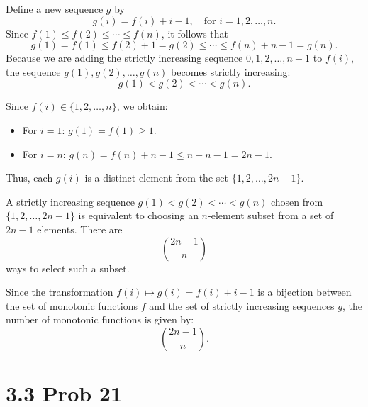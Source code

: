 \documentclass{report}
\begin{document}

\begin{proofWithHibiscus}
  Define a new sequence \( g \) by
  \[
  g(i) = f(i) + i - 1, \quad \text{for } i=1,2,\dots,n.
  \]
  Since \( f(1)\le f(2)\le \cdots \le f(n) \), it follows that
  \[
  g(1) = f(1) \le f(2) + 1 = g(2) \le \cdots \le f(n) + n - 1 = g(n).
  \]
  Because we are adding the strictly increasing sequence \( 0,1,2,\dots,n-1 \) to \( f(i) \), the sequence \( g(1), g(2), \dots, g(n) \) becomes strictly increasing:
  \[
  g(1) < g(2) < \cdots < g(n).
  \]
  
  \bigskip 

  Since \( f(i) \in \{1,2,\dots,n\} \), we obtain:
  \begin{itemize}
      \item For \( i=1 \): \( g(1) = f(1) \ge 1 \).
      \item For \( i=n \): \( g(n) = f(n) + n - 1 \le n + n - 1 = 2n - 1 \).
  \end{itemize}
  
  Thus, each \( g(i) \) is a distinct element from the set \( \{1, 2, \dots, 2n-1\} \).
  
  \bigskip
  
  A strictly increasing sequence \( g(1) < g(2) < \cdots < g(n) \) chosen from \( \{1,2,\dots,2n-1\} \) is equivalent to choosing an \( n \)-element subset from a set of \( 2n-1 \) elements. There are
  \[
  \binom{2n-1}{n}
  \]
  ways to select such a subset.
    
  Since the transformation \( f(i) \mapsto g(i) = f(i) + i - 1 \) is a bijection between the set of monotonic functions \( f \) and the set of strictly increasing sequences \( g \), the number of monotonic functions is given by:
  \[
  \boxed{\binom{2n-1}{n}}.
  \]
\end{proofWithHibiscus}

\section*{3.3 Prob 21}
\end{document}
